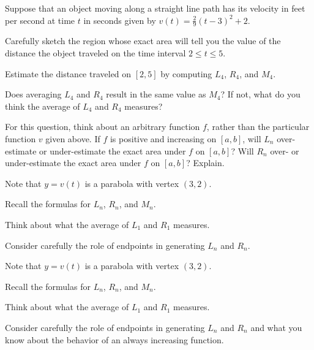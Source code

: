 \begin{activity} \label{A:4.2.2}  Suppose that an object moving along a straight line path has its velocity in feet per second at time $t$ in seconds given by $v(t) = \frac{2}{9}(t-3)^2 + 2$.
\ba
	\item Carefully sketch the region whose exact area will tell you the value of the distance the object traveled on the time interval $2 \le t \le 5$.
	\item Estimate the distance traveled on $[2,5]$ by computing $L_4$, $R_4$, and $M_4$.
	\item Does averaging $L_4$ and $R_4$ result in the same value as $M_4$?  If not, what do you think the average of $L_4$ and $R_4$ measures?
	\item For this question, think about an arbitrary function $f$, rather than the particular function $v$ given above.  If $f$ is positive and increasing on $[a,b]$, will $L_n$ over-estimate or under-estimate the exact area under $f$ on $[a,b]$?  Will $R_n$ over- or under-estimate the exact area under $f$ on $[a,b]$? Explain.
\ea
\end{activity}
\begin{smallhint}
\ba
	\item Note that $y = v(t)$ is a parabola with vertex $(3,2)$.
	\item Recall the formulas for $L_n$, $R_n$, and $M_n$.
	\item Think about what the average of $L_1$ and $R_1$ measures.
	\item Consider carefully the role of endpoints in generating $L_n$ and $R_n$.
\ea
\end{smallhint}
\begin{bighint}
\ba
	\item Note that $y = v(t)$ is a parabola with vertex $(3,2)$.
	\item Recall the formulas for $L_n$, $R_n$, and $M_n$.
	\item Think about what the average of $L_1$ and $R_1$ measures.
	\item Consider carefully the role of endpoints in generating $L_n$ and $R_n$ and what you know about the behavior of an always increasing function.
\ea
\end{bighint}
